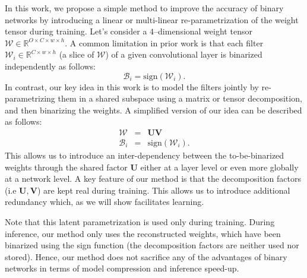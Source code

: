 \documentclass[10pt,twocolumn,letterpaper]{article}
\newcommand{\mytensor}[1]{\ensuremath{\mathcal{#1}}}
\newcommand{\mymatrix}[1]{\ensuremath{\mathbf{#1}}}
\begin{document}
In this work, we propose a simple method to improve the accuracy of binary networks by introducing a linear or multi-linear re-parametrization of the weight tensor during training. Let's consider a \(4\)--dimensional weight tensor \(\mytensor{W}\in\mathbb{R}^{O \times C \times w \times h}\).
A common limitation in prior work is that each filter $\mytensor{W}_i\in\mathbb{R}^{C\times w \times h}$ (a slice of \(\mytensor{W}\)) of a given convolutional layer is binarized independently as follows: 
\begin{equation}
    \mytensor{B}_i = \text{sign}(\mytensor{W}_i). \nonumber
\end{equation} 
In contrast, our key idea in this work is to model the filters jointly by re-parametrizing them in a shared subspace using a matrix or tensor decomposition, and then binarizing the weights. A simplified version of our idea can be described as follows:
\begin{eqnarray}
    \mytensor{W} & = & \mymatrix{U}\mymatrix{V}\nonumber \\
    \mytensor{B}_i & = & \text{sign}(\mytensor{W}_i).\nonumber
\end{eqnarray}
This allows us to introduce an inter-dependency between the to-be-binarized weights through the shared factor $\mymatrix{U}$ either at a layer level or even more globally at a network level. A key feature of our method is that the decomposition factors (i.e $\mymatrix{U}, \mymatrix{V}$) are kept real during training. This allows us to introduce additional redundancy which, as we will show facilitates learning. 

Note that this latent parametrization is used only during training. During inference, our method only uses the reconstructed weights, which have been binarized using the sign function (the decomposition factors are neither used nor stored). Hence, our method does not sacrifice any of the advantages of binary networks in terms of model compression and inference speed-up.
\end{document}
